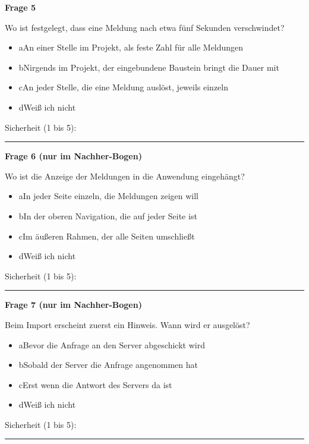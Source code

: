 \medskip

\noindent\begin{minipage}{\linewidth}
\textbf{Frage 5}\par
Wo ist festgelegt, dass eine Meldung nach etwa fünf Sekunden verschwindet?

\begin{itemize}[nosep,leftmargin=2.4em]
\item[\kreuz] a\quad An einer Stelle im Projekt, als feste Zahl für alle Meldungen
\item[\kreuz] b\quad Nirgends im Projekt, der eingebundene Baustein bringt die Dauer mit
\item[\kreuz] c\quad An jeder Stelle, die eine Meldung auslöst, jeweils einzeln
\item[\kreuz] d\quad Weiß ich nicht
\end{itemize}
\noindent Sicherheit (1 bis 5):~\rule{2.5em}{0.4pt}\par
\end{minipage}

\medskip

\noindent\begin{minipage}{\linewidth}
\textbf{Frage 6 (nur im Nachher-Bogen)}\par
Wo ist die Anzeige der Meldungen in die Anwendung eingehängt?

\begin{itemize}[nosep,leftmargin=2.4em]
\item[\kreuz] a\quad In jeder Seite einzeln, die Meldungen zeigen will
\item[\kreuz] b\quad In der oberen Navigation, die auf jeder Seite ist
\item[\kreuz] c\quad Im äußeren Rahmen, der alle Seiten umschließt
\item[\kreuz] d\quad Weiß ich nicht
\end{itemize}
\noindent Sicherheit (1 bis 5):~\rule{2.5em}{0.4pt}\par
\end{minipage}

\medskip

\noindent\begin{minipage}{\linewidth}
\textbf{Frage 7 (nur im Nachher-Bogen)}\par
Beim Import erscheint zuerst ein Hinweis. Wann wird er ausgelöst?

\begin{itemize}[nosep,leftmargin=2.4em]
\item[\kreuz] a\quad Bevor die Anfrage an den Server abgeschickt wird
\item[\kreuz] b\quad Sobald der Server die Anfrage angenommen hat
\item[\kreuz] c\quad Erst wenn die Antwort des Servers da ist
\item[\kreuz] d\quad Weiß ich nicht
\end{itemize}
\noindent Sicherheit (1 bis 5):~\rule{2.5em}{0.4pt}\par
\end{minipage}

